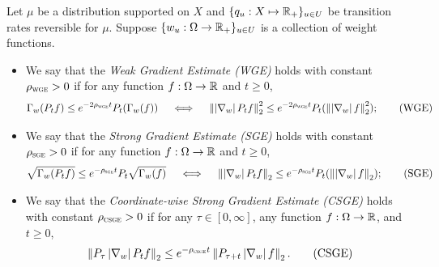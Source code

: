 \begin{definition}
    Let $\mu$ be a distribution supported on $X$ and $\{q_u: X \mapsto \mathbb{R}_+\}_{u\in U}$ be transition rates reversible for $\mu$.
    Suppose $\{w_u:\Omega \to \mathbb{R}_+\}_{u\in U}$ is a collection of weight functions. 
    \begin{itemize}
        \item We say that the \emph{Weak Gradient Estimate (WGE)} holds with constant $\rho_{{\normalfont\textsc{wge}}} > 0$ if for any function $f:\Omega \to \mathbb{R}$ and $t\geq 0$, 
        \begin{align}\label{eq:WGE-2}
            \Gamma_w(P_t f) \leq e^{-2\rho_{{\normalfont\textsc{wge}}} t} P_t(\Gamma_w(f)) \quad\iff\quad \left\lVert \left\vert\nabla_w\right\vert P_t f \right\rVert^2_2 \leq e^{-2\rho_{{\normalfont\textsc{wge}}} t} P_t(\left\lVert \left\vert\nabla_w\right\vert f \right\rVert^2_2); \tag{WGE}
        \end{align}
        \item We say that the \emph{Strong Gradient Estimate (SGE)} holds with constant $\rho_{{\normalfont\textsc{sge}}} > 0$ if for any function $f: \Omega \to \mathbb{R}$ and $t\geq 0$, 
        \begin{align}\label{eq:SGE-2}
            \sqrt{\Gamma_w(P_t f)} \leq e^{-\rho_{{\normalfont\textsc{sge}}} t} P_t  \sqrt{\Gamma_w(f)} \quad\iff\quad \left\lVert \left\vert\nabla_w\right\vert P_t f \right\rVert_2 \leq e^{-\rho_{{\normalfont\textsc{sge}}} t} P_t(\left\lVert \left\vert\nabla_w\right\vert f \right\rVert_2); \tag{SGE}
        \end{align}
        \item  We say that the \emph{Coordinate-wise Strong Gradient Estimate (CSGE)} holds with constant $\rho_{{\normalfont\textsc{csge}}} > 0$ if for any $\tau \in [0,\infty]$, any function $f: \Omega \to \mathbb{R}$, and $t\geq 0$, 
        \begin{align}\label{eq:CSGE-2}
            \left\lVert P_\tau \left\vert\nabla_w\right\vert P_t f \right\rVert_2 \leq e^{-\rho_{{\normalfont\textsc{csge}}} t}\left\lVert P_{\tau+t} \left\vert\nabla_w\right\vert f \right\rVert_2. \tag{CSGE}
        \end{align}
    \end{itemize}
\end{definition}





